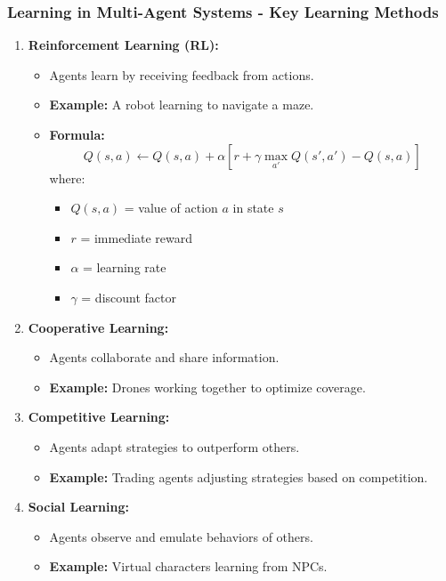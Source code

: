 \documentclass[aspectratio=169]{beamer}
\begin{document}
\begin{frame}[fragile]
    \frametitle{Learning in Multi-Agent Systems - Key Learning Methods}
    \begin{enumerate}
        \item \textbf{Reinforcement Learning (RL):}
        \begin{itemize}
            \item Agents learn by receiving feedback from actions.
            \item \textbf{Example:} A robot learning to navigate a maze.
            \item \textbf{Formula:} 
            \begin{equation}
                Q(s, a) \leftarrow Q(s, a) + \alpha \left[ r + \gamma \max_{a'} Q(s', a') - Q(s, a) \right]
            \end{equation}
            where:
            \begin{itemize}
                \item \( Q(s, a) \) = value of action \( a \) in state \( s \)
                \item \( r \) = immediate reward
                \item \( \alpha \) = learning rate
                \item \( \gamma \) = discount factor
            \end{itemize}
        \end{itemize}

        \item \textbf{Cooperative Learning:}
        \begin{itemize}
            \item Agents collaborate and share information.
            \item \textbf{Example:} Drones working together to optimize coverage.
        \end{itemize}
        
        \item \textbf{Competitive Learning:}
        \begin{itemize}
            \item Agents adapt strategies to outperform others.
            \item \textbf{Example:} Trading agents adjusting strategies based on competition.
        \end{itemize}

        \item \textbf{Social Learning:}
        \begin{itemize}
            \item Agents observe and emulate behaviors of others.
            \item \textbf{Example:} Virtual characters learning from NPCs.
        \end{itemize}
    \end{enumerate}
\end{frame}
\end{document}
